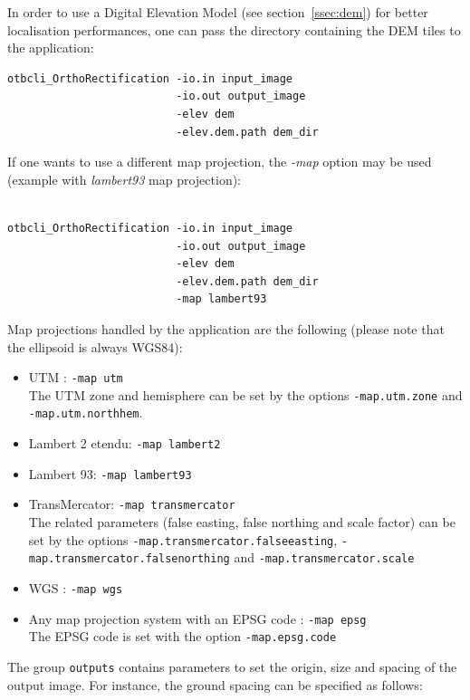 In order to use a Digital Elevation Model (see section~\ref{ssec:dem})
for better localisation performances, one can pass the directory
containing the DEM tiles to the application:

\begin{verbatim}
otbcli_OrthoRectification -io.in input_image 
                          -io.out output_image 
                          -elev dem
                          -elev.dem.path dem_dir
\end{verbatim}

If one wants to use a different map projection, the \emph{-map}
option may be used (example with \emph{lambert93} map projection):

\begin{verbatim}

otbcli_OrthoRectification -io.in input_image 
                          -io.out output_image 
                          -elev dem
                          -elev.dem.path dem_dir 
                          -map lambert93

\end{verbatim}

Map projections handled by the application are the following
(please note that the ellipsoid is always WGS84):
\begin{itemize}
\item UTM : \verb?-map utm? \\
The UTM zone and hemisphere can be set by the options \verb?-map.utm.zone? and \verb?-map.utm.northhem?.
\item Lambert 2 etendu: \verb?-map lambert2?
\item Lambert 93: \verb?-map lambert93?
\item TransMercator: \verb?-map transmercator? \\
The related parameters (false easting, false northing and scale factor) can be set by the 
options \verb?-map.transmercator.falseeasting?, \verb?-map.transmercator.falsenorthing? and 
\verb?-map.transmercator.scale?
\item WGS : \verb?-map wgs?
\item Any map projection system with an EPSG code : \verb?-map epsg? \\
The EPSG code is set with the option \verb?-map.epsg.code?
\end{itemize}

The group \verb?outputs? contains parameters to set the origin, size and spacing of the output image.
For instance, the ground spacing can be specified as follows:

